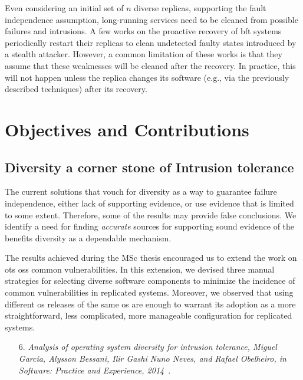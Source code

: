 Even considering an initial set of $n$ diverse replicas, supporting the fault independence assumption, long-running services need to be cleaned from possible failures and intrusions.
A few works on the proactive recovery of \gls{bft} systems~\cite{Castro:2002,Sousa:2010,Roeder:2010,Platania:2014,Distler:2011} periodically restart their replicas to clean undetected faulty states introduced by a stealth attacker. 
However, a common limitation of these works is that they assume that these weaknesses will be cleaned after the recovery.
In practice, this will not happen unless the replica changes its software (e.g., via the previously described techniques) after its recovery.



\section{Objectives and Contributions}


\subsection*{Diversity a corner stone of Intrusion tolerance}
The current solutions that vouch for diversity as a way to guarantee failure independence, either lack of supporting evidence, or use evidence that is limited to some extent.
Therefore, some of the results may provide false conclusions.
We identify a need for finding \emph{accurate} sources for supporting sound evidence of the benefits diversity as a dependable mechanism.


The results achieved during the MSc thesis encouraged us to extend the work on \gls{ots} \glspl{os} common vulnerabilities.
In this extension, we devised three manual strategies for selecting diverse software components to minimize the incidence of common vulnerabilities in replicated systems.
Moreover, we observed that using different \gls{os} releases of the same \gls{os} are enough to warrant its adoption as a more straightforward, less complicated, more manageable configuration for replicated systems.

\begin{enumerate}
\item[6.] \emph{Analysis of operating system diversity for intrusion tolerance, Miguel Garcia, Alysson Bessani, Ilir Gashi Nuno Neves, and Rafael Obelheiro, in Software: Practice and Experience, 2014}~\cite{Garcia:2014}.
\end{enumerate}



